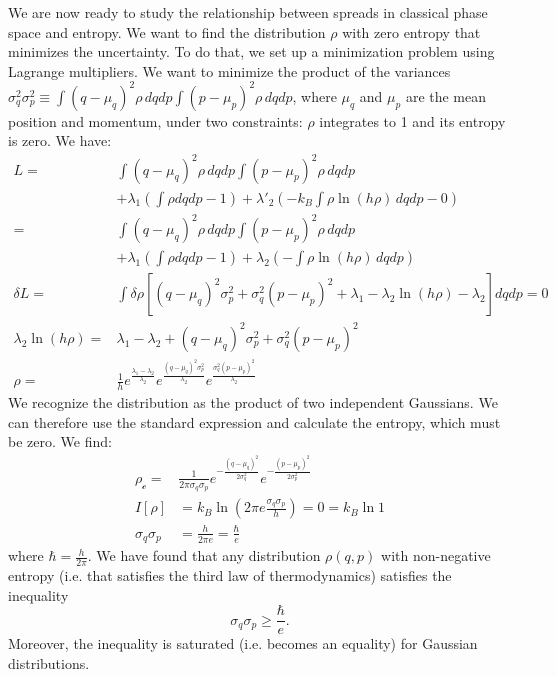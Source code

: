 We are now ready to study the relationship between spreads in classical phase space and entropy. We want to find the distribution $\rho$ with zero entropy that minimizes the uncertainty. To do that, we set up a minimization problem using Lagrange multipliers. We want to minimize the product of the variances $\sigma_q^2 \sigma_p^2 \equiv \int (q-\mu_q)^2 \rho \, dqdp \int (p-\mu_p)^2 \rho \, dqdp$, where $\mu_q$ and $\mu_p$ are the mean position and momentum, under two constraints: $\rho$ integrates to 1 and its entropy is zero. We have: 
\begin{align*}
	L = &\int (q-\mu_q)^2 \rho \, dqdp \int (p-\mu_p)^2 \rho \, dqdp \\
	&+ \lambda_1(\int \rho dqdp - 1) + \lambda'_2(- k_B \int \rho \ln (h \rho) \, dqdp - 0)\\
	= &\int (q-\mu_q)^2 \rho \, dqdp \int (p-\mu_p)^2 \rho \, dqdp \\
&+ \lambda_1(\int \rho dqdp - 1) + \lambda_2(- \int \rho \ln (h \rho) \, dqdp )\\
	\delta L = &\int \delta \rho [(q-\mu_q)^2 \sigma_p^2 + \sigma_q^2 (p-\mu_p)^2 +  \lambda_1 - \lambda_2 \ln (h \rho) - \lambda_2 ] dqdp = 0 \\
	\lambda_2 \ln (h \rho) = &\lambda_1 - \lambda_2 + (q-\mu_q)^2 \sigma_p^2 + \sigma_q^2 (p-\mu_p)^2 \\
	\rho = &\frac{1}{h} e^{\frac{\lambda_1 - \lambda_2}{\lambda_2}}e^{\frac{(q-\mu_q)^2 \sigma_p^2}{\lambda_2}}e^{\frac{\sigma_q^2 (p-\mu_p)^2}{\lambda_2}}
\end{align*}
We recognize the distribution as the product of two independent Gaussians. We can therefore use the standard expression and calculate the entropy, which must be zero. We find:
\begin{align*}
	\rho_{\mathcal{c}} = &\frac{1}{ 2 \pi \sigma_q \sigma_p} e^{-\frac{(q-\mu_q)^2}{2\sigma_q^2}} e^{-\frac{(p-\mu_p)^2}{2\sigma_p^2}} \\
	I[\rho] &= k_B \ln \left( 2\pi e \frac{\sigma_q\sigma_p}{h}  \right) = 0 = k_B \ln 1  \\
	\sigma_q \sigma_p &= \frac{h}{2 \pi e} = \frac{\hbar}{e}
\end{align*}
where $\hbar = \frac{h}{2\pi}$. We have found that any distribution $\rho(q,p)$ with non-negative entropy (i.e. that satisfies the third law of thermodynamics) satisfies the inequality
\begin{equation}\label{rp-cm-classicalUncertaintyPrinciple}
	\sigma_q \sigma_p \geq \frac{\hbar}{e}.
\end{equation}
Moreover, the inequality is saturated (i.e. becomes an equality) for Gaussian distributions.

